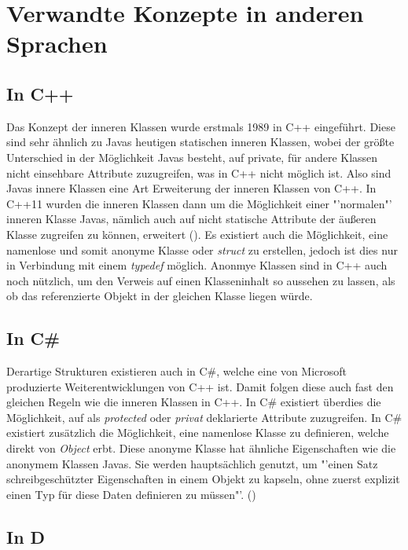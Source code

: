 \chapter{Verwandte Konzepte in anderen Sprachen}
\section{In C++}

Das Konzept der inneren Klassen wurde erstmals 1989 in C++ eingeführt.
Diese sind sehr ähnlich zu Javas heutigen statischen inneren Klassen, wobei der größte Unterschied in der Möglichkeit Javas besteht, auf private, für andere Klassen nicht einsehbare Attribute zuzugreifen, was in C++ nicht möglich ist.
Also sind Javas innere Klassen eine Art Erweiterung der inneren Klassen von C++.
In C++11 wurden die inneren Klassen dann um die Möglichkeit einer "'normalen"' inneren Klasse Javas,
 nämlich auch auf nicht statische Attribute der äußeren Klasse zugreifen zu können, erweitert (\cite{Ellis2007}).
Es existiert auch die Möglichkeit, eine namenlose und somit anonyme Klasse oder {\it struct} zu erstellen, jedoch
ist dies nur in Verbindung mit einem {\it typedef} möglich. Anonmye Klassen sind in C++ auch noch nützlich, um den Verweis auf einen Klasseninhalt so aussehen zu lassen, als ob das
referenzierte Objekt in der gleichen Klasse liegen würde.

\section{In C\#}

Derartige Strukturen existieren auch in C\#, welche eine von Microsoft produzierte Weiterentwicklungen von C++ ist.
Damit folgen diese auch fast den gleichen Regeln wie die inneren Klassen in C++.
In C\# existiert überdies die Möglichkeit, auf als {\it protected} oder {\it privat} deklarierte Attribute zuzugreifen.
In C\# existiert zusätzlich die Möglichkeit, eine namenlose
Klasse zu definieren, welche direkt von {\it Object} erbt. Diese anonyme Klasse hat ähnliche Eigenschaften wie die anonymem Klassen Javas. Sie werden hauptsächlich genutzt,
um "'einen Satz schreibgeschützter Eigenschaften in einem Objekt zu kapseln, ohne zuerst explizit einen Typ für diese Daten definieren zu müssen"'. (\cite{Microsoft:Csharp})

\newpage
\section{In D}

